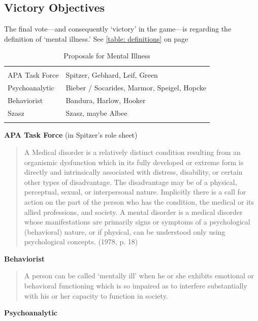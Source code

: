 \begin{refsection}
\subsection{Victory Objectives}
\label{victoryobjectives}

The final vote---and consequently `victory' in the game---is regarding the definition of `mental illness.' See \ref{table: definitions} on page \pageref{table: definitions}

 \begin{longtable}[!t]{ | P{3cm} | P{8cm} |  }
\hline
{}&
\\
APA Task Force&
Spitzer, Gebhard, Leif, Green\\
Psychoanalytic&
Bieber / Socarides, Marmor, Speigel, Hopcke\\
Behaviorist&
Bandura, Harlow, Hooker\\
Szasz&
Szasz, maybe Albee\\ \hline
\caption{Proposals for Mental Illness}
\label{table: mentalillness}
\end{longtable}

\textbf{APA Task Force} (in Spitzer's role sheet)

\begin{quote}

A Medical disorder is a relatively distinct condition resulting from an organismic dysfunction which in its fully developed or extreme form is directly and intrinsically associated with distress, disability, or certain other types of disadvantage. The disadvantage may be of a physical, perceptual, sexual, or interpersonal nature. Implicitly there is a call for action on the part of the person who has the condition, the medical or its allied professions, and society.
A mental disorder is a medical disorder whose manifestations are primarily signs or symptoms of a psychological (behavioral) nature, or if physical, can be understood only using psychological concepts. (1978, p. 18)
\end{quote}

\textbf{Behaviorist}

\begin{quote}

A person can be called `mentally ill' when he or she exhibits emotional or behavioral functioning which is so impaired as to interfere substantially with his or her capacity to function in society. 
\end{quote}

\textbf{Psychoanalytic} 


\end{refsection}
